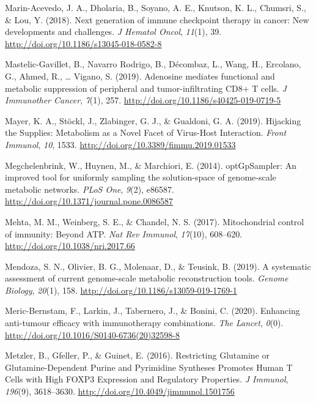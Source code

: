 \documentclass[12pt,twoside,openany,\mydriver]{thesis}  %
\begin{document}
\leavevmode\hypertarget{ref-marin-acevedo_next_2018}{}%
Marin-Acevedo, J. A., Dholaria, B., Soyano, A. E., Knutson, K. L., Chumsri, S., \& Lou, Y. (2018). Next generation of immune checkpoint therapy in cancer: New developments and challenges. \emph{J Hematol Oncol}, \emph{11}(1), 39. \url{http://doi.org/10.1186/s13045-018-0582-8}

\leavevmode\hypertarget{ref-mastelic-gavillet_adenosine_2019}{}%
Mastelic-Gavillet, B., Navarro Rodrigo, B., Décombaz, L., Wang, H., Ercolano, G., Ahmed, R., \ldots{} Vigano, S. (2019). Adenosine mediates functional and metabolic suppression of peripheral and tumor-infiltrating CD8+ T cells. \emph{J Immunother Cancer}, \emph{7}(1), 257. \url{http://doi.org/10.1186/s40425-019-0719-5}

\leavevmode\hypertarget{ref-mayer_hijacking_2019}{}%
Mayer, K. A., Stöckl, J., Zlabinger, G. J., \& Gualdoni, G. A. (2019). Hijacking the Supplies: Metabolism as a Novel Facet of Virus-Host Interaction. \emph{Front Immunol}, \emph{10}, 1533. \url{http://doi.org/10.3389/fimmu.2019.01533}

\leavevmode\hypertarget{ref-megchelenbrink_optgpsampler_2014}{}%
Megchelenbrink, W., Huynen, M., \& Marchiori, E. (2014). optGpSampler: An improved tool for uniformly sampling the solution-space of genome-scale metabolic networks. \emph{PLoS One}, \emph{9}(2), e86587. \url{http://doi.org/10.1371/journal.pone.0086587}

\leavevmode\hypertarget{ref-mehta_mitochondrial_2017}{}%
Mehta, M. M., Weinberg, S. E., \& Chandel, N. S. (2017). Mitochondrial control of immunity: Beyond ATP. \emph{Nat Rev Immunol}, \emph{17}(10), 608--620. \url{http://doi.org/10.1038/nri.2017.66}

\leavevmode\hypertarget{ref-mendoza_systematic_2019}{}%
Mendoza, S. N., Olivier, B. G., Molenaar, D., \& Teusink, B. (2019). A systematic assessment of current genome-scale metabolic reconstruction tools. \emph{Genome Biology}, \emph{20}(1), 158. \url{http://doi.org/10.1186/s13059-019-1769-1}

\leavevmode\hypertarget{ref-meric-bernstam_enhancing_2020}{}%
Meric-Bernstam, F., Larkin, J., Tabernero, J., \& Bonini, C. (2020). Enhancing anti-tumour efficacy with immunotherapy combinations. \emph{The Lancet}, \emph{0}(0). \url{http://doi.org/10.1016/S0140-6736(20)32598-8}

\leavevmode\hypertarget{ref-metzler_restricting_2016}{}%
Metzler, B., Gfeller, P., \& Guinet, E. (2016). Restricting Glutamine or Glutamine-Dependent Purine and Pyrimidine Syntheses Promotes Human T Cells with High FOXP3 Expression and Regulatory Properties. \emph{J Immunol}, \emph{196}(9), 3618--3630. \url{http://doi.org/10.4049/jimmunol.1501756}
\end{document}
